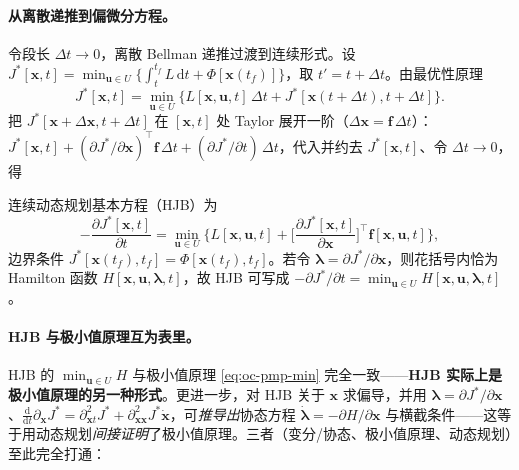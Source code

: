\paragraph{从离散递推到偏微分方程。}
令段长 $\Delta t\to0$，离散 Bellman 递推过渡到连续形式。设 $J^*[\mathbf x,t]=\min_{\mathbf u\in U}\{\int_t^{t_f}L\,\mathrm dt+\Phi[\mathbf x(t_f)]\}$，取 $t'=t+\Delta t$。由最优性原理
\begin{equation}
  J^*[\mathbf x,t]=\min_{\mathbf u\in U}\big\{L[\mathbf x,\mathbf u,t]\,\Delta t+J^*[\mathbf x(t+\Delta t),t+\Delta t]\big\}.
  \label{eq:oc-hjb-step}
\end{equation}
把 $J^*[\mathbf x+\Delta\mathbf x,t+\Delta t]$ 在 $[\mathbf x,t]$ 处 Taylor 展开一阶（$\Delta\mathbf x=\mathbf f\,\Delta t$）：$J^*[\mathbf x,t]+(\partial J^*/\partial\mathbf x)^\top\mathbf f\,\Delta t+(\partial J^*/\partial t)\,\Delta t$，代入并约去 $J^*[\mathbf x,t]$、令 $\Delta t\to0$，得

\begin{theorem}\label{thm:oc-hjb}
连续动态规划基本方程（HJB）为
\begin{equation}
  \boxed{-\frac{\partial J^*[\mathbf x,t]}{\partial t}=\min_{\mathbf u\in U}\Big\{L[\mathbf x,\mathbf u,t]+\Big[\frac{\partial J^*[\mathbf x,t]}{\partial\mathbf x}\Big]^\top\mathbf f[\mathbf x,\mathbf u,t]\Big\},}
  \label{eq:oc-hjb}
\end{equation}
边界条件 $J^*[\mathbf x(t_f),t_f]=\Phi[\mathbf x(t_f),t_f]$。若令 $\boldsymbol\lambda=\partial J^*/\partial\mathbf x$，则花括号内恰为 Hamilton 函数 $H[\mathbf x,\mathbf u,\boldsymbol\lambda,t]$，故 HJB 可写成 $-\partial J^*/\partial t=\min_{\mathbf u\in U}H[\mathbf x,\mathbf u,\boldsymbol\lambda,t]$。
\end{theorem}

\paragraph{HJB 与极小值原理互为表里。}
HJB 的 $\min_{\mathbf u\in U}H$ 与极小值原理 \cref{eq:oc-pmp-min} 完全一致——\textbf{HJB 实际上是极小值原理的另一种形式}。更进一步，对 HJB 关于 $\mathbf x$ 求偏导，并用 $\boldsymbol\lambda=\partial J^*/\partial\mathbf x$、$\frac{\mathrm d}{\mathrm dt}\partial_\mathbf x J^*=\partial_{\mathbf x t}^2J^*+\partial_{\mathbf x\mathbf x}^2J^*\dot{\mathbf x}$，可\emph{推导出}协态方程 $\dot{\boldsymbol\lambda}=-\partial H/\partial\mathbf x$ 与横截条件——这等于用动态规划\emph{间接证明}了极小值原理\cite{liubao2006modern}。三者（变分/协态、极小值原理、动态规划）至此完全打通：

